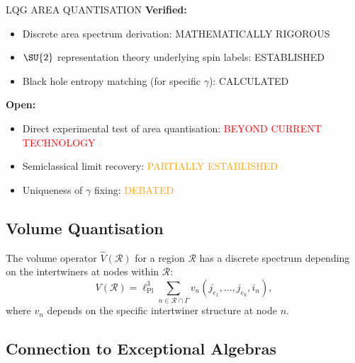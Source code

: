 \begin{factcheck}{LQG AREA QUANTISATION}
\textbf{Verified:}
\begin{itemize}
    \item Discrete area spectrum derivation:
          \textcolor{validcolor}{MATHEMATICALLY RIGOROUS}
    \item $\SU{2}$ representation theory underlying spin labels:
          \textcolor{validcolor}{ESTABLISHED}
    \item Black hole entropy matching (for specific $\gamma$):
          \textcolor{validcolor}{CALCULATED}~\cite{ashtekar1997quantum}
\end{itemize}

\textbf{Open:}
\begin{itemize}
    \item Direct experimental test of area quantisation:
          \textcolor{red}{BEYOND CURRENT TECHNOLOGY}
    \item Semiclassical limit recovery:
          \textcolor{orange}{PARTIALLY ESTABLISHED}
    \item Uniqueness of $\gamma$ fixing:
          \textcolor{orange}{DEBATED}
\end{itemize}
\end{factcheck}

\subsection{Volume Quantisation}

\begin{theorem}
\label{thm:volume_spectrum}
The volume operator $\hat{V}(\mathcal{R})$ for a region $\mathcal{R}$
has a discrete spectrum depending on the intertwiners at nodes within
$\mathcal{R}$:
\begin{equation}
V(\mathcal{R}) = \ell_{\mathrm{Pl}}^3 \sum_{n \in \mathcal{R} \cap \Gamma}
v_n(j_{e_1}, \ldots, j_{e_k}, i_n),
\end{equation}
where $v_n$ depends on the specific intertwiner structure at node $n$.
\end{theorem}

\subsection{Connection to Exceptional Algebras}

